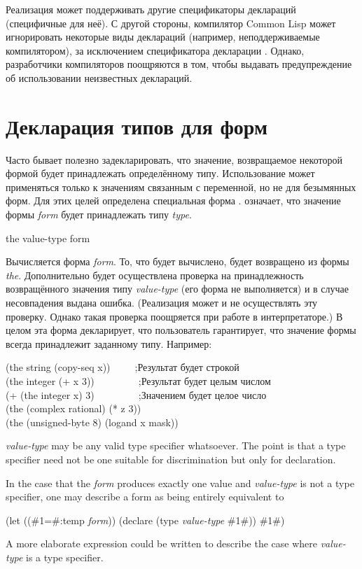 Реализация может поддерживать другие спецификаторы деклараций (специфичные для
неё).
С другой стороны, компилятор Common Lisp может игнорировать некоторые виды
деклараций (например, неподдерживаемые компилятором), за исключением
спецификатора декларации .
Однако, разработчики компиляторов поощряются в том, чтобы выдавать
предупреждение об использовании неизвестных деклараций.

\section{Декларация типов для форм}

Часто бывает полезно задекларировать, что значение, возвращаемое некоторой
формой будет принадлежать определённому типу.
Использование  может применяться только к значениям связанным с
переменной, но не для безымянных форм. Для этих целей определена специальная
форма .   означает, что значение
формы \emph{form} будет принадлежать типу \emph{type}.

\begin{defspec}
the value-type form

Вычисляется форма \emph{form}. То, что будет вычислено, будет возвращено из
формы \emph{the}. Дополнительно будет осуществлена проверка на принадлежность
возвращённого значения типу \emph{value-type} (его форма не выполняется) и в
случае несовпадения выдана ошибка. (Реализация может и не осуществлять эту
проверку. Однако такая проверка поощряется при работе в интерпретаторе.) В целом
эта форма декларирует, что пользователь гарантирует, что значение формы всегда
принадлежит заданному типу.
Например:
\begin{lisp}
(the string (copy-seq x))~~~~~;\textrm{Результат будет строкой} \\
(the integer (+ x 3))~~~~~~~~~;\textrm{Результат \cdf{+} будет целым числом} \\
(+ (the integer x) 3)~~~~~~~~~;\textrm{Значением  будет целое число} \\
(the (complex rational) (* z 3)) \\
(the (unsigned-byte 8) (logand x mask))
\end{lisp}


\emph{value-type} may be any valid type specifier whatsoever.
The point is that a type specifier need not be one suitable for
discrimination but only for declaration.

In the case that the \emph{form} produces exactly one value and \emph{value-type}
is not a  type specifier, one may describe a  form
as being entirely equivalent to
\begin{lisp}
(let ((\#1=\#:temp \emph{form})) (declare (type \emph{value-type} \#1\#)) \#1\#)
\end{lisp}
A more elaborate expression could be written to describe the case where
\emph{value-type} is a  type specifier.
\end{defspec}

\fi